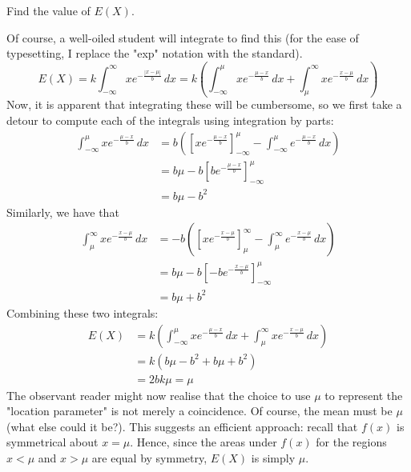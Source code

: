 \documentclass[../jarvis.tex]{subfiles}
\begin{document}
\begin{example}[cont.]
Find the value of $E(X)$.
\end{example}
Of course, a well-oiled student will integrate to find this (for the ease of typesetting, I replace the "exp" notation with the standard).
$$
    E(X)=k\int_{-\infty}^{\infty}xe^{-\frac{|x-\mu|}{b}} \,dx
        =k\left(\int_{-\infty}^{\mu}xe^{-\frac{\mu-x}{b}}\,dx+\int_{\mu}^{\infty}xe^{-\frac{x-\mu}{b}}\,dx\right)
$$
Now, it is apparent that integrating these will be cumbersome, so we first take a detour to compute each of the integrals using integration by parts:
\begin{align*}
    \int_{-\infty}^{\mu}xe^{-\frac{\mu-x}{b}}\,dx
    &=b\left(\left[xe^{-\frac{\mu-x}{b}}\right]_{-\infty}^{\mu}-\int_{-\infty}^{\mu}e^{-\frac{\mu-x}{b}}\,dx\right) \\
    &=b\mu-b\left[be^{-\frac{\mu-x}{b}}\right]_{-\infty}^{\mu} \\
    &= b\mu-b^2
\end{align*}
Similarly, we have that
\begin{align*}
    \int_{\mu}^{\infty}xe^{-\frac{x-\mu}{b}}\,dx
    &=-b\left(\left[xe^{-\frac{x-\mu}{b}}\right]_{\mu}^{\infty}-\int_{\mu}^{\infty}e^{-\frac{x-\mu}{b}}\,dx\right) \\
    &=b\mu-b\left[-be^{-\frac{x-\mu}{b}}\right]_{-\infty}^{\mu} \\
    &= b\mu+b^2
\end{align*}
Combining these two integrals:
\begin{align*}
    E(X)&=k\left(\int_{-\infty}^{\mu}xe^{-\frac{\mu-x}{b}}\,dx+\int_{\mu}^{\infty}xe^{-\frac{x-\mu}{b}}\,dx\right) \\
    &=k(b\mu-b^2+b\mu+b^2) \\
    &= 2bk\mu = \mu
\end{align*}
The observant reader might now realise that the choice to use $\mu$ to represent the "location parameter" is not merely a coincidence.  Of course, the mean must be $\mu$ (what else could it be?). This suggests an efficient approach: recall that $f(x)$ is symmetrical about $x=\mu$. Hence, since the areas under $f(x)$ for the regions $x < \mu$ and $x > \mu$ are equal by symmetry, $E(X)$ is simply $\mu$.
\end{document}

